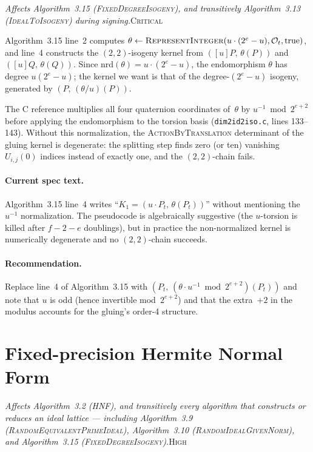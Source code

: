 \documentclass[a4paper,11pt]{article}
\newcommand{\algo}[1]{Algorithm~#1}
\newcommand{\critical}{\textsc{\color{BrickRed}Critical}}
\newcommand{\high}{\textsc{\color{BurntOrange}High}}
\newcommand{\finding}[2]{\noindent\textit{#1}\hfill#2\par\smallskip}
\begin{document}
\finding{Affects \algo{3.15}
(\textsc{FixedDegreeIsogeny}), and transitively \algo{3.13}
(\textsc{IdealToIsogeny}) during signing.}{\critical}

\algo{3.15} line~2 computes
$\theta \leftarrow \textsc{RepresentInteger}(u \cdot (2^{e} - u),
\mathcal{O}_t, \mathrm{true})$, and line~4 constructs the
$(2,2)$-isogeny kernel from $([u]P,\, \theta(P))$ and
$([u]Q,\, \theta(Q))$.  Since $\mathrm{nrd}(\theta) = u \cdot
(2^{e} - u)$, the endomorphism $\theta$ has degree
$u (2^{e} - u)$; the kernel we want is that of the degree-$(2^{e}-u)$
isogeny, generated by $(P,\, (\theta/u)(P))$.

The C reference multiplies all four quaternion coordinates of~$\theta$
by $u^{-1} \bmod 2^{e+2}$ before applying the endomorphism to the
torsion basis (\texttt{dim2id2iso.c}, lines 133--143).  Without this
normalization, the \textsc{ActionByTranslation} determinant of the
gluing kernel is degenerate: the splitting step finds zero (or ten)
vanishing~$U_{i,j}(0)$ indices instead of exactly one, and the
$(2,2)$-chain fails.

\paragraph{Current spec text.}
\algo{3.15} line~4 writes ``$K_1 = (u \cdot P_t,\, \theta(P_t))$''
without mentioning the $u^{-1}$ normalization.  The pseudocode is
algebraically suggestive (the $u$-torsion is killed after $f{-}2{-}e$
doublings), but in practice the non-normalized kernel is numerically
degenerate and no $(2,2)$-chain succeeds.

\paragraph{Recommendation.}
Replace line~4 of \algo{3.15} with
$(P_t,\, (\theta \cdot u^{-1} \bmod 2^{e+2})(P_t))$ and note
that $u$ is odd (hence invertible mod~$2^{e+2}$) and that the
extra~$+2$ in the modulus accounts for the gluing's order-4
structure.

\section{Fixed-precision Hermite Normal Form}
\label{sec:hnf}

\finding{Affects \algo{3.2} (\textsc{HNF}), and transitively every
algorithm that constructs or reduces an ideal lattice --- including
\algo{3.9} (\textsc{RandomEquivalentPrimeIdeal}),
\algo{3.10} (\textsc{RandomIdealGivenNorm}), and
\algo{3.15} (\textsc{FixedDegreeIsogeny}).}{\high}
\end{document}
